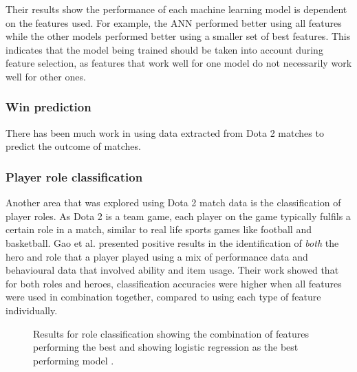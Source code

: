 \documentclass[Report.tex]{subfiles}
\begin{document}
Their results show the performance of each machine learning model is dependent on the features used. For example, the ANN performed better using all features while the other models performed better using a smaller set of best features. This indicates that the model being trained should be taken into account during feature selection, as features that work well for one model do not necessarily work well for other ones. 

\subsubsection{Win prediction}
There has been much work in using data extracted from Dota 2 matches to predict the outcome of matches. \cite{dota-draft} 


\subsubsection{Player role classification}
Another area that was explored using Dota 2 match data is the classification of player roles. As Dota 2 is a team game, each player on the game typically fulfils a certain role in a match, similar to real life sports games like football and basketball. Gao et al. \cite{dota-gao} presented positive results in the identification of \textit{both} the hero and role that a player played using a mix of performance data and behavioural data that involved ability and item usage. Their work showed that for both roles and heroes, classification accuracies were higher when all features were used in combination together, compared to using each type of feature individually.

\begin{figure}[H]
\begin{subfigure}{0.45\textwidth}
\end{subfigure}
\hspace{\fill}
\begin{subfigure}{0.45\textwidth}
\end{subfigure}
\caption{Results for role classification showing the combination of features performing the best \cite{dota-gao} and showing logistic regression as the best performing model \cite{dota-eggert}.}
\end{figure}
\end{document}
